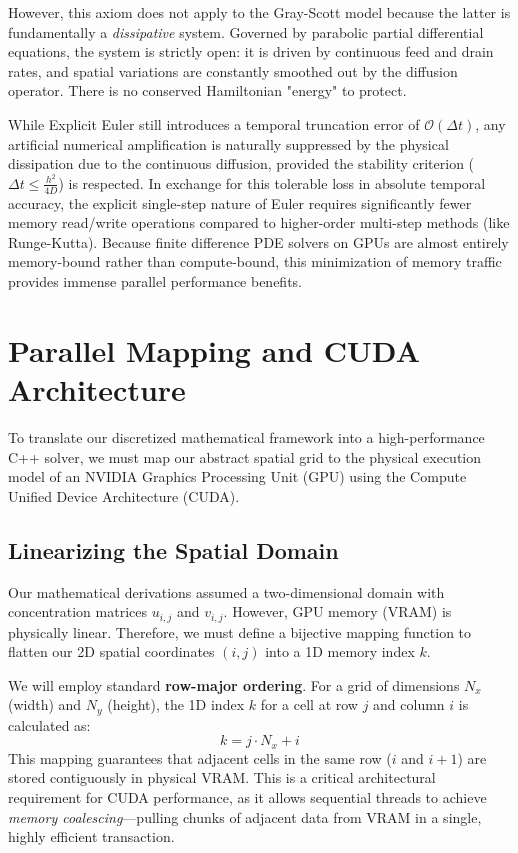 \documentclass[12pt,a4paper]{article}
\begin{document}
However, this axiom does not apply to the Gray-Scott model because the latter is fundamentally a \textit{dissipative} system. Governed by parabolic partial differential equations, the system is strictly open: it is driven by continuous feed and drain rates, and spatial variations are constantly smoothed out by the diffusion operator. There is no conserved Hamiltonian "energy" to protect.

While Explicit Euler still introduces a temporal truncation error of $\mathcal{O}(\Delta t)$, any artificial numerical amplification is naturally suppressed by the physical dissipation due to the continuous diffusion, provided the stability criterion ($\Delta t \le \frac{h^2}{4D}$) is respected. In exchange for this tolerable loss in absolute temporal accuracy, the explicit single-step nature of Euler requires significantly fewer memory read/write operations compared to higher-order multi-step methods (like Runge-Kutta). Because finite difference PDE solvers on GPUs are almost entirely memory-bound rather than compute-bound, this minimization of memory traffic provides immense parallel performance benefits.

\section{Parallel Mapping and CUDA Architecture}

To translate our discretized mathematical framework into a high-performance C++ solver, we must map our abstract spatial grid to the physical execution model of an NVIDIA Graphics Processing Unit (GPU) using the Compute Unified Device Architecture (CUDA).

\subsection{Linearizing the Spatial Domain}
Our mathematical derivations assumed a two-dimensional domain with concentration matrices $u_{i,j}$ and $v_{i,j}$. However, GPU memory (VRAM) is physically linear. Therefore, we must define a bijective mapping function to flatten our 2D spatial coordinates $(i, j)$ into a 1D memory index $k$.

We will employ standard \textbf{row-major ordering}. For a grid of dimensions $N_x$ (width) and $N_y$ (height), the 1D index $k$ for a cell at row $j$ and column $i$ is calculated as:
$$k = j \cdot N_x + i$$
This mapping guarantees that adjacent cells in the same row ($i$ and $i+1$) are stored contiguously in physical VRAM. This is a critical architectural requirement for CUDA performance, as it allows sequential threads to achieve \textit{memory coalescing}—pulling chunks of adjacent data from VRAM in a single, highly efficient transaction.
\end{document}
